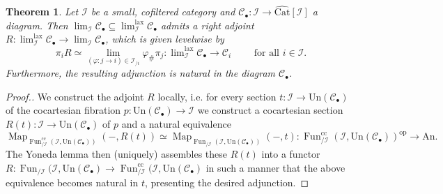 \documentclass[a4paper,reqno,10pt]{amsart}
\newtheorem{theorem}{Theorem}[section]
\theoremstyle{definition}
\theoremstyle{remark}
\newcommand{\sqb}[1]{\left\lbrack #1\right\rbrack}
\newcommand{\C}{\mathcal{C}}
\newcommand{\I}{\mathcal{I}}
\newcommand{\Map}{\operatorname{Map}}
\newcommand{\Fun}{\operatorname{Fun}}
\newcommand{\Un}{\mathrm{Un}}
\newcommand{\Cat}{\mathrm{Cat}}
\newcommand{\An}{\mathrm{An}}
\newcommand{\lax}{\mathrm{lax}}
\newcommand{\op}{\mathrm{op}}
\newcommand{\cc}{\mathrm{cc}}
\begin{document}
\begin{theorem}\label{MainThm}
Let $\I$ be a small, cofiltered category and $\C_{\bullet}\colon\I\rightarrow\widehat{\Cat}\sqb{\I}$ a diagram. Then $\lim_{\I}\C_{\bullet}\subseteq\lim_{\I}^{\lax}\C_{\bullet}$ admits a right adjoint $R\colon\lim^{\lax}_{\I}\C_{\bullet}\rightarrow\lim_{\I}\C_{\bullet}$, which is given levelwise by
\begin{equation*}
\pi_iR\simeq\lim_{(\varphi\colon j\rightarrow i)\in\I_{/i}}\varphi_{\#}\pi_j\colon\lim\nolimits_{\I}^{\lax}\C_{\bullet}\rightarrow\C_i\qquad\text{ for all }i\in\I.
\end{equation*}
Furthermore, the resulting adjunction is natural in the diagram $\C_{\bullet}$.
\end{theorem}
\begin{proof}[Proof.]
We construct the adjoint $R$ locally, i.e. for every section $t\colon\I\rightarrow\Un(\C_{\bullet})$ of the cocartesian fibration $p\colon\Un(\C_{\bullet})\rightarrow\I$ we construct a cocartesian section $R(t)\colon\I\rightarrow\Un(\C_{\bullet})$ of $p$ and a natural equivalence
\begin{equation*}
\Map_{\Fun_{/\I}^{\cc}(\I,\Un(\C_{\bullet}))}(-,R(t))\simeq\Map_{\Fun_{/\I}(\I,\Un(\C_{\bullet}))}(-,t)\colon\Fun_{/\I}^{\cc}(\I,\Un(\C_{\bullet}))^{\op}\rightarrow\An.
\end{equation*}
The Yoneda lemma then (uniquely) assembles these $R(t)$ into a functor $R\colon\Fun_{/\I}(\I,\Un(\C_{\bullet})\rightarrow\Fun_{/\I}^{\cc}(\I,\Un(\C_{\bullet})$ in such a manner that the above equivalence becomes natural in $t$, presenting the desired adjunction.


\end{proof}
\end{document}
